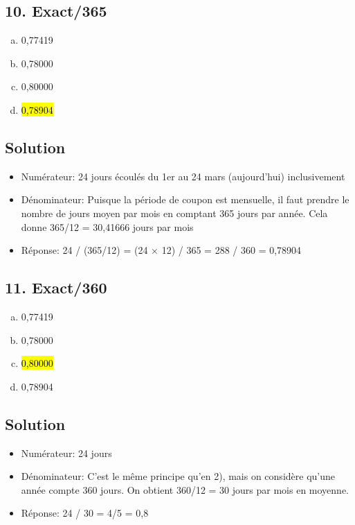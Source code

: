 \documentclass[10pt,a4paper]{article}
\begin{document}
\newpage


\subsection*{10.  Exact/365} 
\begin{enumerate}[a)]
\item 0,77419  
\item 0,78000
\item 0,80000 
\item \hl{0,78904}
\end{enumerate}

\subsection*{Solution}
\begin{itemize}
\item Numérateur: 24 jours écoulés du 1er au 24 mars (aujourd'hui) inclusivement
\item Dénominateur: Puisque la période de coupon est mensuelle, il faut prendre le nombre de jours moyen par mois en comptant 365 jours par année. Cela donne 365/12 = 30,41666 jours par mois
\item Réponse: 24 / (365/12) = (24 × 12) / 365 = 288 / 360 = 0,78904
\end{itemize}

\newpage


\subsection*{11. Exact/360}
\begin{enumerate}[a)]
\item 0,77419  
\item 0,78000 
\item \hl{0,80000}
\item 0,78904
\end{enumerate}

\subsection*{Solution}
\begin{itemize}
\item Numérateur: 24 jours
\item Dénominateur: C'est le même principe qu'en 2), mais on considère qu'une année compte 360 jours. On obtient 360/12 = 30 jours par mois en moyenne.
\item Réponse: 24 / 30 = 4/5 = 0,8
\end{itemize}
\end{document}
